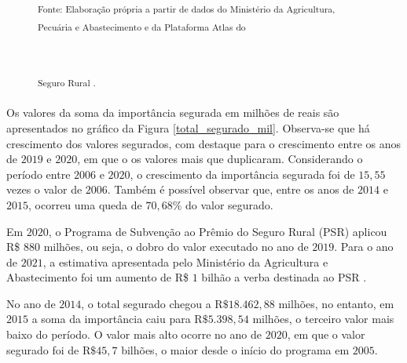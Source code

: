 \begin{figure}[H]
	\hspace{0.1cm}
	
	\parbox{\dimexpr\linewidth-2cm}{\raggedright
    \strut \textsuperscript{Fonte: Elaboração própria a partir de dados do Ministério da Agricultura, Pecuária e Abastecimento e da Plataforma
	Atlas do}\strut}\\
    \parbox{\dimexpr\linewidth-2cm}{\raggedright
    \strut \textsuperscript{Seguro Rural \cite{brasil21b}.}\strut}
\end{figure}

Os valores da soma da importância segurada em milhões de reais são apresentados no gráfico da Figura \ref{total_segurado_mil}. Observa-se que há crescimento dos valores segurados, com destaque para o crescimento entre os anos de $2019$ e $2020$, em que o os valores mais que duplicaram. Considerando o período entre $2006$ e $2020$, o crescimento da importância segurada foi de $15,55$ vezes o valor de $2006$. Também é possível observar que, entre os anos de $2014$ e $2015$, ocorreu uma queda de $70,68\%$ do valor segurado.  

Em $2020$, o Programa de Subvenção ao Prêmio do Seguro Rural (PSR) aplicou R\$ $880$ milhões, ou seja, o dobro do valor executado no ano de  $2019$. Para o ano de $2021$, a estimativa apresentada pelo Ministério da Agricultura e Abastecimento foi um aumento de R\$ $1$ bilhão a verba destinada ao PSR \cite{brasil21b}.

No ano de $2014$, o total segurado chegou a R$\$18.462,88$ milhões, no entanto, em $2015$ a soma da importância caiu para R$\$5.398,54$ milhões, o terceiro valor mais baixo do período. O valor mais alto ocorre no ano de $2020$, em que o valor segurado foi de R$\$45,7$ bilhões, o maior desde o início do programa em $2005$.

